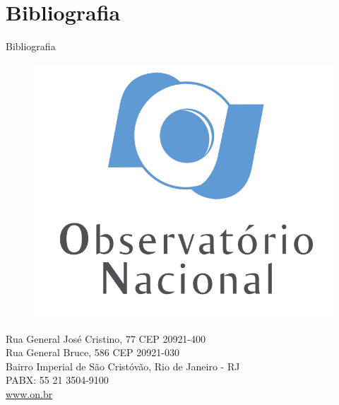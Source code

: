 \documentclass[10pt]{beamer} %
\newcommand{\nologo}{\setbeamertemplate{logo}{}} %
\begin{document}
	
\section{Bibliografia}
	\begin{frame}[allowframebreaks]{Bibliografia}
	\beamertemplatetextbibitems
	\tiny
	
	
	\end{frame}

\makeatother
{\nologo
\begin{frame}
\begin{figure}
\includegraphics[scale=0.25]{Imagens/logonvertical.jpg}
\end{figure}
\begin{center}
\begin{minipage}{0.77\textwidth}
\small
\begin{center}
Rua General José Cristino, 77 CEP 20921-400\\
Rua General Bruce, 586 CEP 20921-030\\
Bairro Imperial de São Cristóvão, Rio de Janeiro - RJ\\
PABX: 55 21 3504-9100\\
\url{www.on.br}
\end{center}
\end{minipage}
\end{center}
\end{frame}
}
\end{document}
